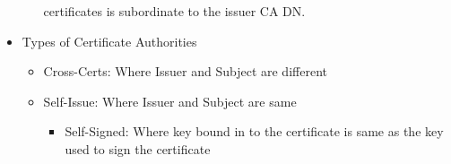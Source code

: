 \documentclass[a4paper]{article}
\begin{document}
\begin{itemize}
\begin{itemize}
                        certificates is subordinate to the issuer CA DN.
                \end{itemize}
            \item Types of Certificate Authorities
                \begin{itemize}
                    \item Cross-Certs: Where Issuer and Subject are different
                    \item Self-Issue: Where Issuer and Subject are same
                        \begin{itemize}
                            \item Self-Signed: Where key bound in to the certificate is same as the key used to sign the certificate
                        \end{itemize}
                \end{itemize}
        \end{itemize}
\end{document}
